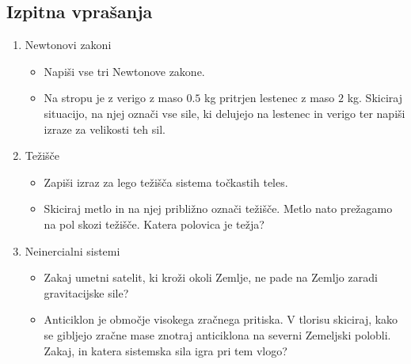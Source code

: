 \newpage
\subsection*{Izpitna vprašanja}
\begin{enumerate}
    \item Newtonovi zakoni
    \begin{itemize}
        \item Napiši vse tri Newtonove zakone.
        \item Na stropu je z verigo z maso \(0.5\) kg pritrjen lestenec z maso \(2\) kg. Skiciraj situacijo, na njej označi vse sile, ki delujejo na lestenec in verigo ter napiši izraze za velikosti teh sil.
    \end{itemize}

    \item Težišče
    \begin{itemize}
        \item Zapiši izraz za lego težišča sistema točkastih teles.
        \item Skiciraj metlo in na njej približno označi težišče. Metlo nato prežagamo na pol skozi težišče. Katera polovica je težja?
    \end{itemize}

    \item Neinercialni sistemi
    \begin{itemize}
        \item Zakaj umetni satelit, ki kroži okoli Zemlje, ne pade na Zemljo zaradi gravitacijske sile?
        \item Anticiklon je območje visokega zračnega pritiska. V tlorisu skiciraj, kako se gibljejo zračne mase znotraj anticiklona na severni Zemeljski polobli. Zakaj, in katera sistemska sila igra pri tem vlogo?
    \end{itemize}
\end{enumerate}